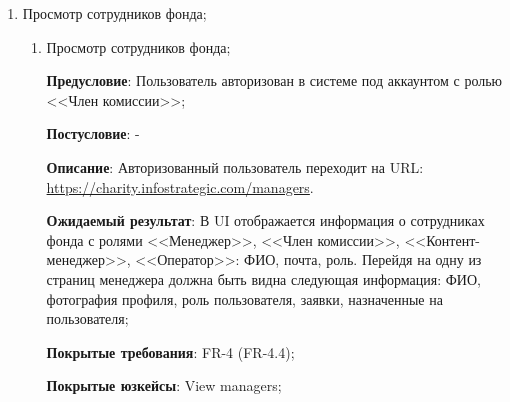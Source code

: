 \begin{enumerate}
    \item Просмотр сотрудников фонда;
    
    \begin{enumerate}
        \item Просмотр сотрудников фонда;
        
        \textbf{Предусловие}: Пользователь авторизован в системе под аккаунтом с ролью <<Член комиссии>>;
        
        \textbf{Постусловие}: -
        
        \textbf{Описание}: Авторизованный пользователь переходит на URL: \url{https://charity.infostrategic.com/managers}. 
        
        \textbf{Ожидаемый результат}: В UI отображается информация о сотрудниках фонда с ролями <<Менеджер>>, <<Член комиссии>>, <<Контент-менеджер>>, <<Оператор>>: ФИО, почта, роль. Перейдя на одну из страниц менеджера должна быть видна следующая информация: ФИО, фотография профиля, роль пользователя, заявки, назначенные на пользователя;
        
        \textbf{Покрытые требования}: FR-4 (FR-4.4);
        
        \textbf{Покрытые юзкейсы}: View managers;
    \end{enumerate}
\end{enumerate}



\renewcommand{\labelenumi}{\arabic{enumi}.}


\renewcommand{\labelenumii}{\arabic{enumii}.}